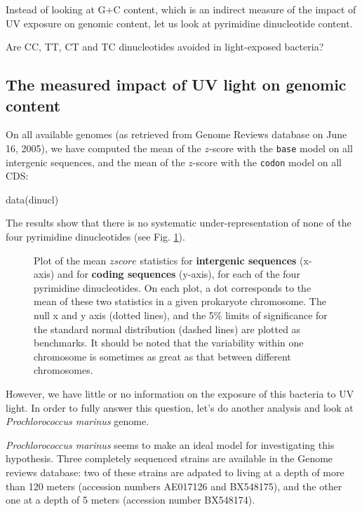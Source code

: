 \documentclass{article}
\begin{document}
Instead of looking at G+C content, which is an indirect measure of the
impact of UV exposure on genomic content, let us look at pyrimidine
dinucleotide content.

Are CC, TT, CT and TC dinucleotides avoided in light-exposed bacteria?

\subsection{The measured impact of UV light on genomic content}

On all available genomes (as retrieved from Genome Reviews database on
June 16, 2005), we have computed the mean of the $z$-score with
the \texttt{base} model on all intergenic sequences, and the mean of
the $z$-score with the \texttt{codon} model on all CDS:

\begin{Schunk}
\begin{Sinput}
 data(dinucl)
\end{Sinput}
\end{Schunk}

The results show that there is no systematic under-representation of
none of the four pyrimidine dinucleotides (see Fig.
\ref{dinucl-graphes}).

\begin{figure}[H]
   \begin{center}
\end{center}
   \caption{Plot of the mean $zscore$ statistics for
   \textbf{intergenic sequences} (x-axis) and for \textbf{coding
   sequences} (y-axis), for each of the four pyrimidine dinucleotides.
   On each plot, a dot corresponds to the mean of these two statistics
   in a given prokaryote chromosome. The null x and y axis (dotted
   lines), and the 5\% limits of significance for the standard normal
   distribution (dashed lines) are plotted as benchmarks. It should be
   noted that the variability within one chromosome is sometimes as
   great as that between different chromosomes.}
\label{dinucl-graphes}
\end{figure}

However, we have little or no information on the exposure of this
bacteria to UV light. In order to fully answer this question, let's do
another analysis and look at \textit{Prochlorococcus marinus} genome.

\textit{Prochlorococcus marinus} seems to make an ideal model for
investigating this hypothesis. Three completely sequenced strains are
available in the Genome reviews database: two of these strains are
adpated to living at a depth of more than 120 meters (accession
numbers AE017126 and BX548175), and the other one at a depth of 5
meters (accession number BX548174).
\end{document}
